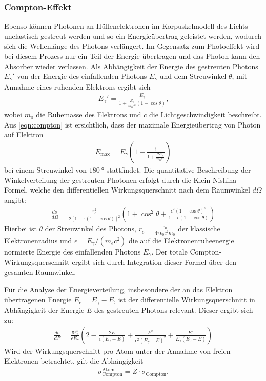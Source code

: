 \subsubsection{Compton-Effekt}
Ebenso können Photonen an Hüllenelektronen im Korpuskelmodell des Lichts unelastisch gestreut werden und so ein Energieübertrag geleistet werden, wodurch sich die Wellenlänge des Photons verlängert. Im Gegensatz zum Photoeffekt wird bei diesem Prozess nur ein Teil der Energie übertragen und das Photon kann den Absorber wieder verlassen.
Als Abhängigkeit der Energie des gestreuten Photons $E_\gamma'$ von der Energie des einfallenden Photons $E_\gamma$ und dem Streuwinkel $\theta$, mit Annahme eines ruhenden Elektrons ergibt sich
\begin{align}
  E_\gamma' = \frac{E_\gamma}{1+\frac{E_\gamma}{m_0c^2}(1-\cos{\theta})}\text{,}\label{eqn:compton}
\end{align}
wobei $m_0$ die Ruhemasse des Elektrons und $c$ die Lichtgeschwindigkeit beschreibt.
Aus \autoref{eqn:compton} ist ersichtlich, dass der maximale Energieübertrag von Photon auf Elektron
\begin{align}
  E_{\text{max}} = E_\gamma\left(1-\frac{1}{1+\frac{2E_\gamma}{m_0c^2}}\right)\label{eqn:Comptonmax}
\end{align}
bei einem Streuwinkel von $\SI{180}{\degree}$ stattfindet.
Die quantitative Beschreibung der Winkelverteilung der gestreuten Photonen erfolgt durch die Klein-Nishina-Formel, welche den differentiellen Wirkungsquerschnitt nach dem Raumwinkel \(d\Omega\) angibt:
\begin{align}
  \frac{d\sigma}{d\Omega} = \frac{r_e^2}{2 [1 + \epsilon (1 - \cos \theta)]^2} \left( 1 + \cos^2 \theta + \frac{\epsilon^2 (1 - \cos \theta)^2}{1 + \epsilon (1 - \cos \theta)} \right) \label{eq:klein_nishina_dOmega}
\end{align}
Hierbei ist \(\theta\) der Streuwinkel des Photons, \(r_e = \frac{e_0}{4\pi\epsilon_0c^2m_0}\) der klassische Elektronenradius und \(\epsilon = E_\gamma / (m_e c^2)\) die auf die Elektronenruheenergie normierte Energie des einfallenden Photons \(E_\gamma\). Der totale Compton-Wirkungsquerschnitt ergibt sich durch Integration dieser Formel über den gesamten Raumwinkel.

Für die Analyse der Energieverteilung, insbesondere der an das Elektron übertragenen Energie \(E_e = E_\gamma - E\), ist der differentielle Wirkungsquerschnitt in Abhängigkeit der Energie \(E\) des gestreuten Photons relevant. Dieser ergibt sich zu:
\begin{align}
  \frac{d\sigma}{dE} = \frac{\pi r_e^2}{\epsilon E_\gamma} \left( 2 - \frac{2E}{\epsilon (E_\gamma - E)} + \frac{E^2}{\epsilon^2 (E_\gamma - E)^2} + \frac{E^2}{E_\gamma (E_\gamma - E)} \right) \label{eqn:Wirkungsquerschnitt}
\end{align}
Wird der Wirkungsquerschnitt pro Atom unter der Annahme von freien Elektronen betrachtet, gilt die Abhängigkeit
\begin{align}
  \sigma_\text{Compton}^\text{Atom}=Z\cdot \sigma_\text{Compton}\text{.}
\end{align}

